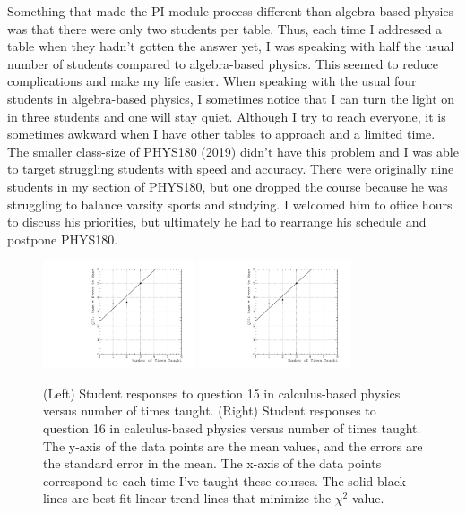 \documentclass[../../main.tex]{subfiles}
\begin{document}
Something that made the PI module process different than algebra-based physics was that there were only two students per table.  Thus, each time I addressed a table when they hadn't gotten the answer yet, I was speaking with half the usual number of students compared to algebra-based physics.  This seemed to reduce complications and make my life easier.  When speaking with the usual four students in algebra-based physics, I sometimes notice that I can turn the light on in three students and one will stay quiet.  Although I try to reach everyone, it is sometimes awkward when I have other tables to approach and a limited time.  The smaller class-size of PHYS180 (2019) didn't have this problem and I was able to target struggling students with speed and accuracy.  There were originally nine students in my section of PHYS180, but one dropped the course because he was struggling to balance varsity sports and studying.  I welcomed him to office hours to discuss his priorities, but ultimately he had to rearrange his schedule and postpone PHYS180. \\ \hspace{0.1cm}

\begin{figure}
\centering
\includegraphics[width=0.4\textwidth]{Q15_calculus_based.pdf}
\includegraphics[width=0.4\textwidth]{Q16_calculus_based.pdf}
\caption{\label{fig:courses:intro_q15_2}  (Left) Student responses to question 15 in calculus-based physics versus number of times taught. (Right) Student responses to question 16 in calculus-based physics versus number of times taught.  The y-axis of the data points are the mean values, and the errors are the standard error in the mean.  The x-axis of the data points correspond to each time I've taught these courses.  The solid black lines are best-fit linear trend lines that minimize the $\chi^2$ value.}
\end{figure}
\end{document}
